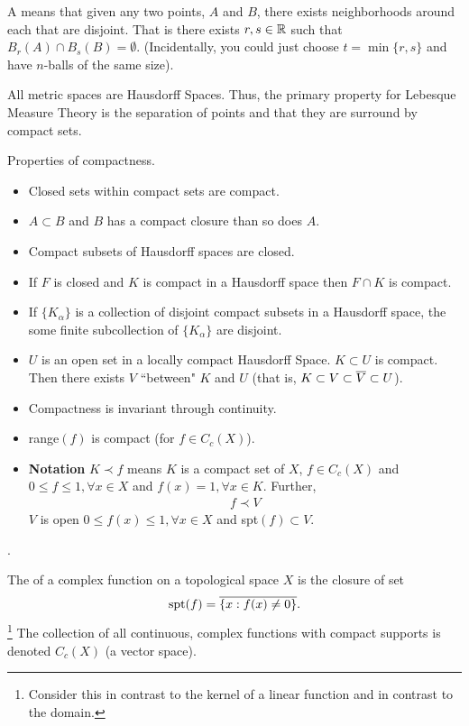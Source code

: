 \documentclass[10pt,a4paper]{report}
\begin{document}
{\begin{remark}
A  means that given any two points, $A$ and $B$, there exists neighborhoods around each that are disjoint.  That is there exists $r,s \in \mathbb{R}$ such that $B_r(A) \cap B_s(B) = \emptyset$.  (Incidentally, you could just choose $t = \min\{r,s\}$ and have $n$-balls of the same size).

All metric spaces are Hausdorff Spaces.  Thus, the primary property for Lebesque Measure Theory is the separation of points and that they are surround by compact sets.

Properties of compactness.
\begin{itemize}
	\item Closed sets within compact sets are compact.
	\item $A \subset B$ and $B$ has a compact closure than so does $A$.
	\item Compact subsets of Hausdorff spaces are closed.
	\item If $F$ is closed and $K$ is compact in a Hausdorff space then $F \cap K$ is compact.
	\item If $\{K_\alpha\}$ is a collection of disjoint compact subsets in a Hausdorff space, the some finite subcollection of $\{K_\alpha\}$ are disjoint.
	\item $U$ is an open set in a locally compact Hausdorff Space. $K\subset U$ is compact.  Then there exists $V$ ``between" $K$ and $U$ (that is, $K \subset V \subset \overline{V} \subset U$).
	\item Compactness is invariant through continuity.
	\item range$(f)$ is compact (for $f\in C_c(X)$).
	\item \textbf{Notation} $K \prec f$ means $K$ is a compact set of $X$, $f \in C_c(X)$ and $0\le f \le 1, \forall x\in X$ and $f(x)=1, \forall x\in K$.  Further,
	\begin{align*}
		 f \prec V
	\end{align*}$V$ is open $0\le f(x) \le 1, \forall x\in X$ and spt$(f)\subset V$.
\end{itemize}
\end{remark}

\begin{definition}.

The  of a complex function on a topological space $X$ is the closure of set 
\begin{align*}
	\text{spt}(f) = \overline{\{ x: f(x) \ne 0 \}}.
\end{align*} \footnote{Consider this in contrast to the kernel of a linear function and in contrast to the domain.}
The collection of all continuous, complex functions with compact supports is denoted $C_c(X)$ (a vector space).
\end{definition}

}
\end{document}
